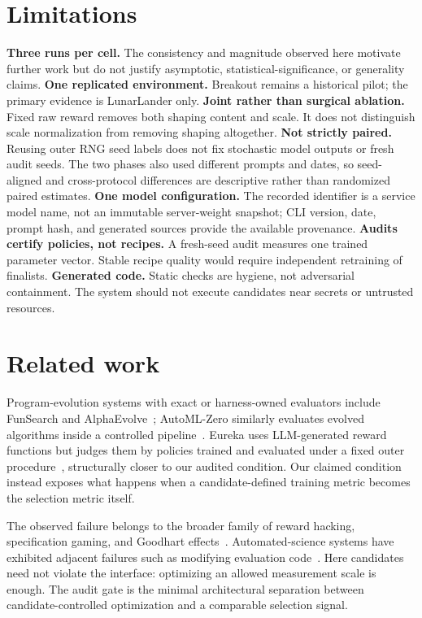 \documentclass[11pt]{article}
\begin{document}
\section{Limitations}

\textbf{Three runs per cell.} The consistency and magnitude observed here motivate further
work but do not justify asymptotic, statistical-significance, or generality claims.
\textbf{One replicated environment.} Breakout remains a historical pilot; the primary evidence is
LunarLander only.
\textbf{Joint rather than surgical ablation.} Fixed raw reward removes both shaping content and
scale. It does not distinguish scale normalization from removing shaping altogether.
\textbf{Not strictly paired.} Reusing outer RNG seed labels does not fix stochastic model outputs
or fresh audit seeds. The two phases also used different prompts and dates, so seed-aligned and
cross-protocol differences are descriptive rather than randomized paired estimates.
\textbf{One model configuration.} The recorded identifier is a service model name, not an
immutable server-weight snapshot; CLI version, date, prompt hash, and generated sources provide
the available provenance.
\textbf{Audits certify policies, not recipes.} A fresh-seed audit measures one trained parameter
vector. Stable recipe quality would require independent retraining of finalists.
\textbf{Generated code.} Static checks are hygiene, not adversarial containment. The system should
not execute candidates near secrets or untrusted resources.

\section{Related work}

Program-evolution systems with exact or harness-owned evaluators include FunSearch and
AlphaEvolve~\citep{romeraparedes2024funsearch,novikov2025alphaevolve}; AutoML-Zero similarly
evaluates evolved algorithms inside a controlled pipeline~\citep{real2020automlzero}. Eureka
uses LLM-generated reward functions but judges them by policies trained and evaluated under a
fixed outer procedure~\citep{ma2024eureka}, structurally closer to our audited condition. Our
claimed condition instead exposes what happens when a candidate-defined training metric becomes
the selection metric itself.

The observed failure belongs to the broader family of reward hacking, specification gaming, and
Goodhart effects~\citep{krakovna2020specification,skalse2022defining,pan2022effects,
lehman2020surprising,manheim2018categorizing}. Automated-science systems have exhibited adjacent
failures such as modifying evaluation code~\citep{lu2024aiscientist}. Here candidates need not
violate the interface: optimizing an allowed measurement scale is enough. The audit gate is the
minimal architectural separation between candidate-controlled optimization and a comparable
selection signal.
\end{document}
